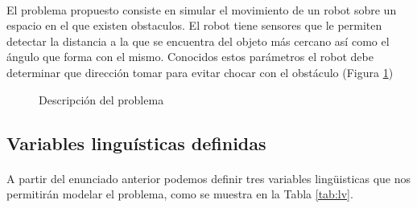 \documentclass[a4paper,10pt,twocolumn]{article}
\begin{document}
  \paragraph{}   El problema propuesto consiste en simular el movimiento de un robot sobre un espacio en el que existen obstaculos.
  El robot tiene sensores que le permiten detectar la distancia a la que se encuentra del objeto más cercano así como el ángulo que forma
  con el mismo. Conocidos estos parámetros el robot debe determinar que dirección tomar para evitar chocar con el obstáculo (Figura \ref{fig:problem})
  
	\begin{figure}[htb]%
		\begin{center}
			\setlength\fboxsep{0pt}
			\setlength\fboxrule{1.5pt}
		\end{center}
		\caption{Descripción del problema \label{fig:problem}}%
	\end{figure}

\subsection{Variables linguísticas definidas}\label{sub:variables}
\paragraph{}A partir del enunciado anterior podemos definir tres variables lingüisticas que nos permitirán modelar el problema, como se muestra en la Tabla \ref{tab:lv}.
\end{document}
